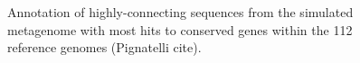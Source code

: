 \documentclass[11pt]{article} %
\begin{document}
\begin{figure}
\caption{Annotation of highly-connecting sequences from the simulated metagenome with most hits to conserved genes within the 112 reference genomes (Pignatelli cite).  }
\end{figure}
\end{document}
